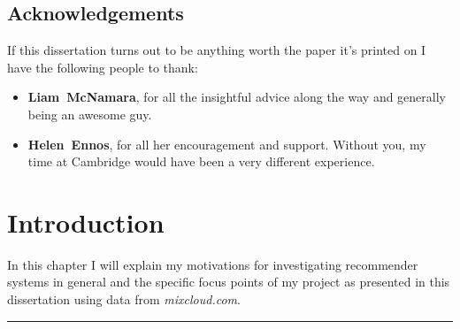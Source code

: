 \documentclass[a4paper,12pt,twoside,notitlepage]{report}
\def\mixurl{\emph{mixcloud.com}}
\newcommand{\rulewidth}{300pt}
\newcommand{\halfrule}{
  \begin{center}
    {\rule{\rulewidth}{0.5pt}}
  \end{center}}
\begin{document}
\medskip
{}


\clearpage


\section*{Acknowledgements}

If this dissertation turns out to be anything worth the paper it's printed on I
have the following people to thank:

\begin{itemize}
 \item {\bf Liam~McNamara}, for all the insightful advice along the way and
generally being an awesome guy.
 \item {\bf Helen~Ennos}, for all her encouragement and support. Without you, my
time at Cambridge would have been a very different experience. 
\end{itemize}

\cleardoublepage

\tableofcontents
\clearpage

\clearpage
\listoffigures

\clearpage
\listoftables

\clearpage
\lstlistoflistings

\cleardoublepage



\setcounter{page}{1}
\setcounter{chapter}{0}
\pagestyle{headings}


\chapter{Introduction}


In this chapter I will explain my motivations for investigating recommender
systems in general and the specific focus points of my project as
presented in this dissertation using data from \mixurl.

\halfrule
\end{document}
